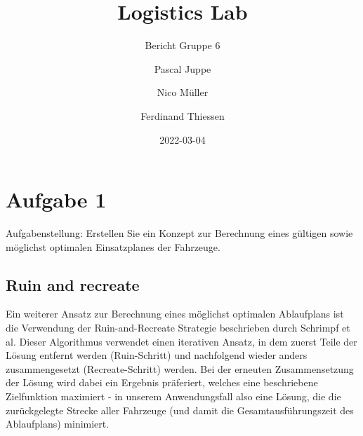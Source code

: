 \documentclass[ngerman]{tudscrreprt}
\begin{document}
\date{2022-03-04}
\author{%
Pascal Juppe%
%
\and%
Nico Müller%
%
\and%
Ferdinand Thiessen%
%
}
\title{Logistics Lab}
\subtitle{Bericht Gruppe 6}
\maketitle


\setcounter{tocdepth}{1}
\tableofcontents

\chapter{Aufgabe 1}
Aufgabenstellung: Erstellen Sie ein Konzept zur Berechnung eines gültigen sowie möglichst optimalen Einsatzplanes der Fahrzeuge.

\section{Ruin and recreate}
Ein weiterer Ansatz zur Berechnung eines möglichst optimalen Ablaufplans ist die Verwendung der Ruin-and-Recreate Strategie beschrieben durch Schrimpf et al. \cite{schrimpf} Dieser Algorithmus verwendet einen iterativen Ansatz, in dem zuerst Teile der Lösung entfernt werden (Ruin-Schritt) und nachfolgend wieder anders zusammengesetzt (Recreate-Schritt) werden. Bei der erneuten Zusammensetzung der Lösung wird dabei ein Ergebnis präferiert, welches eine beschriebene Zielfunktion maximiert - in unserem Anwendungsfall also eine Lösung, die die zurückgelegte Strecke aller Fahrzeuge (und damit die Gesamtausführungszeit des Ablaufplans) minimiert.
\end{document}
